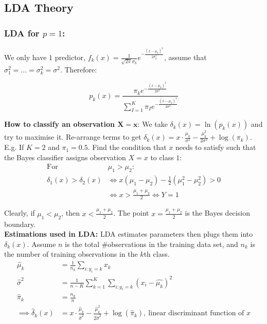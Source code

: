 \documentclass[11pt]{article}
\begin{document}
\subsection{LDA Theory}

\subsubsection{LDA for $p = 1$:}
\noindent We only have $1$ predictor, $f_k(x) = \frac{1}{\sqrt{2\pi}\sigma_{k}}e^{-\frac{(x-\mu_k)^2}{2\sigma_{k}^{2}}}$, assume that $\sigma_1^2 = ... = \sigma_k^2 = \sigma^2$. Therefore:

$$p_k(x) = \frac{\pi_k e^{-\frac{(x - \mu_k)^2}{2\sigma^2}}}{\sum_{I=1}^{K}{\pi_I  e^{-\frac{(x - \mu_k)^2}{2\sigma^2}}}}$$

\noindent \textbf{How to classify an observation $\boldsymbol{X = x}$}: We take $\delta_k(x) = \ln(p_k(x))$ and try to maximise it. Re-arrange terms to get $\delta_k(x) = x \cdot \frac{\mu_k}{\sigma^2} - \frac{\mu_k^2}{2\sigma^2} + \log(\pi_k)$. \\

\noindent E.g. If $K=2$ and $\pi_1 = 0.5$. Find the condition that $x$ needs to satisfy such that the Bayes classifier assigns observation $X=x$ to class $1$: \\

\begin{align*}
    \text{For } & \mu_1 > \mu_2: \\
    \delta_1(x) > \delta_{2}(x) &\Leftrightarrow x(\mu_1 - \mu_2) - \frac{1}{2}(\mu_1^2 - \mu_2^2) > 0 \\
    &\Leftrightarrow x > \frac{\mu_1 + \mu_2}{2} \Leftrightarrow Y = 1
\end{align*}

\noindent Clearly, if $\mu_1 < \mu_2$, then $x < \frac{\mu_1 + \mu_2}{2}$. The point $x = \frac{\mu_1 + \mu_2}{2}$ is the Bayes decision boundary. \\

\noindent \textbf{Estimations used in LDA:} LDA estimates parameters then plugs them into $\delta_k(x)$. Assume $n$ is the total \#observations in the training data set, and $n_k$ is the number of training observations in the $k$th class. \\

\begin{align*}
    \hat{\mu}_k &= \frac{1}{n_k} \sum_{i: y_i = k}{x_k} \\
    \hat{\sigma}^2 &= \frac{1}{n-K}\sum_{k=1}^{K}\sum_{i: y_i = k}(x_i - \hat{\mu_k})^2 \\
    \hat{\pi}_k &= \frac{n_k}{n} \\
    \implies \hat{\delta}_k(x) &= x \cdot \frac{\hat{\mu}_k}{\hat{\sigma}^2} - \frac{\hat{\mu}_k^2}{2\hat{\sigma}^2} + \log(\hat{\pi}_k), \ \text{linear discriminant function of $x$}
\end{align*}
\end{document}
